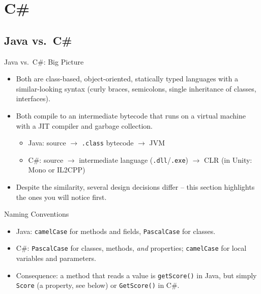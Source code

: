 
\section{C\#}


\subsection{Java vs.\ C\#}

\begin{frame}{Java vs.\ C\#: Big Picture}
  \begin{itemize}
    \item Both are class-based, object-oriented, statically typed languages
      with a similar-looking syntax (curly braces, semicolons, single
      inheritance of classes, interfaces).
    \item Both compile to an intermediate bytecode that runs on a virtual
      machine with a JIT compiler and garbage collection.
      \begin{itemize}
        \item Java: source $\to$ \texttt{.class} bytecode $\to$ JVM
        \item C\#: source $\to$ intermediate language (\texttt{.dll}/\texttt{.exe})
          $\to$ CLR (in Unity: Mono or IL2CPP)
      \end{itemize}
    \item Despite the similarity, several design decisions differ --
      this section highlights the ones you will notice first.
  \end{itemize}
\end{frame}

\begin{frame}{Naming Conventions}
  \begin{itemize}
    \item Java: \texttt{camelCase} for methods and fields,
      \texttt{PascalCase} for classes.
    \item C\#: \texttt{PascalCase} for classes, methods, \emph{and}
      properties; \texttt{camelCase} for local variables and parameters.
    \item Consequence: a method that reads a value is
      \texttt{getScore()} in Java, but simply \texttt{Score} (a property,
      see below) or \texttt{GetScore()} in C\#.
  \end{itemize}
\end{frame}

